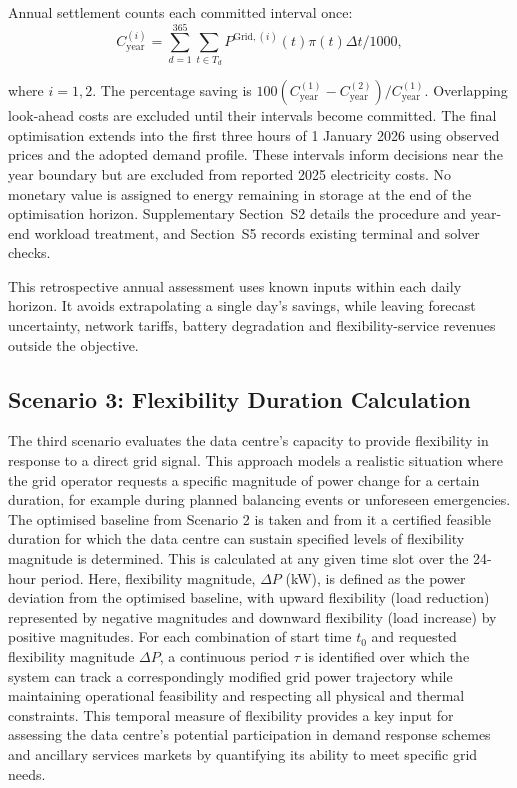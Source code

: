 \documentclass[lettersize,journal]{IEEEtran}
\providecommand{\DIFadd}[1]{{\color{blue}#1}}
\providecommand{\DIFaddbegin}{}
\providecommand{\DIFaddend}{}
\begin{document}
\DIFadd{Annual settlement counts each committed interval once:
}\begingroup\color{blue}
\begin{equation}
C^{(i)}_{\mathrm{year}}=\sum_{d=1}^{365}\sum_{t\in T_d}P^{\mathrm{Grid},(i)}(t)\pi(t)\Delta t/1000,
\label{eq:annual-cost}
\end{equation}
\endgroup
\DIFadd{where $i=1,2$. The percentage saving is $100(C^{(1)}_{\mathrm{year}}-C^{(2)}_{\mathrm{year}})/C^{(1)}_{\mathrm{year}}$. Overlapping look-ahead costs are excluded until their intervals become committed. The final optimisation extends into the first three hours of 1 January 2026 using observed prices and the adopted demand profile. These intervals inform decisions near the year boundary but are excluded from reported 2025 electricity costs. No monetary value is assigned to energy remaining in storage at the end of the optimisation horizon. Supplementary Section~S2 details the procedure and year-end workload treatment, and Section~S5 records existing terminal and solver checks.

}

\DIFadd{This retrospective annual assessment uses known inputs within each daily horizon. It avoids extrapolating a single day's savings, while leaving forecast uncertainty, network tariffs, battery degradation and flexibility-service revenues outside the objective.

}


\DIFaddend \subsection{Scenario 3: Flexibility Duration Calculation}\label{sec:scenario 3}
The third scenario evaluates the data centre's capacity to provide flexibility in response to a direct grid signal. This approach models a realistic situation where the grid operator requests a specific magnitude of power change for a certain duration, for example during planned balancing events or unforeseen emergencies. The optimised baseline from Scenario 2 is taken and from it  \DIFaddbegin \DIFadd{a certified feasible }\DIFaddend duration for which the  \DIFaddbegin \DIFadd{data centre }\DIFaddend can sustain specified levels of flexibility magnitude is determined. This is calculated at any given time slot over the 24-hour period. Here, flexibility magnitude, $\Delta P$ (kW), is defined as the power deviation from the optimised baseline\DIFaddbegin \DIFadd{, }\DIFaddend with upward flexibility (load reduction) represented by negative magnitudes and downward flexibility (load increase) by positive magnitudes. For each combination of start time $t_0$ and requested flexibility magnitude $\Delta P$,  \DIFaddbegin \DIFadd{a }\DIFaddend continuous period $\tau$ is  \DIFaddbegin \DIFadd{identified }\DIFaddend over which the system can track a correspondingly modified  \DIFaddbegin \DIFadd{grid power }\DIFaddend trajectory while maintaining operational feasibility and respecting all physical and thermal constraints. This temporal measure of flexibility provides a key input for assessing the  \DIFaddbegin \DIFadd{data centre}\DIFaddend 's potential participation in  \DIFaddbegin \DIFadd{demand response schemes and ancillary services }\DIFaddend markets by quantifying its ability to meet specific grid needs.
\end{document}
